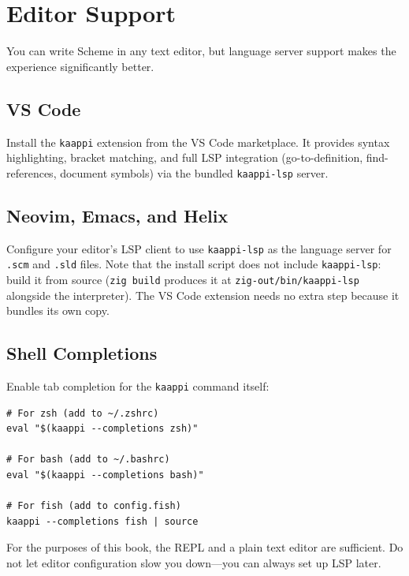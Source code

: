\section{Editor Support}

You can write Scheme in any text editor, but language server support makes the experience significantly better.

\subsection{VS Code}

Install the \texttt{kaappi} extension from the VS Code marketplace. It provides syntax highlighting, bracket matching, and full LSP integration (go-to-definition, find-references, document symbols) via the bundled \texttt{kaappi-lsp} server.

\subsection{Neovim, Emacs, and Helix}

Configure your editor's LSP client to use \texttt{kaappi-lsp} as the language server for \texttt{.scm} and \texttt{.sld} files. Note that the install script does not include \texttt{kaappi-lsp}: build it from source (\texttt{zig build} produces it at \texttt{zig-out/bin/kaappi-lsp} alongside the interpreter). The VS Code extension needs no extra step because it bundles its own copy.

\subsection{Shell Completions}

Enable tab completion for the \texttt{kaappi} command itself:

\begin{Verbatim}[fontsize=\small]
# For zsh (add to ~/.zshrc)
eval "$(kaappi --completions zsh)"

# For bash (add to ~/.bashrc)
eval "$(kaappi --completions bash)"

# For fish (add to config.fish)
kaappi --completions fish | source
\end{Verbatim}

\begin{note}
For the purposes of this book, the REPL and a plain text editor are sufficient. Do not let editor configuration slow you down---you can always set up LSP later.
\end{note}

